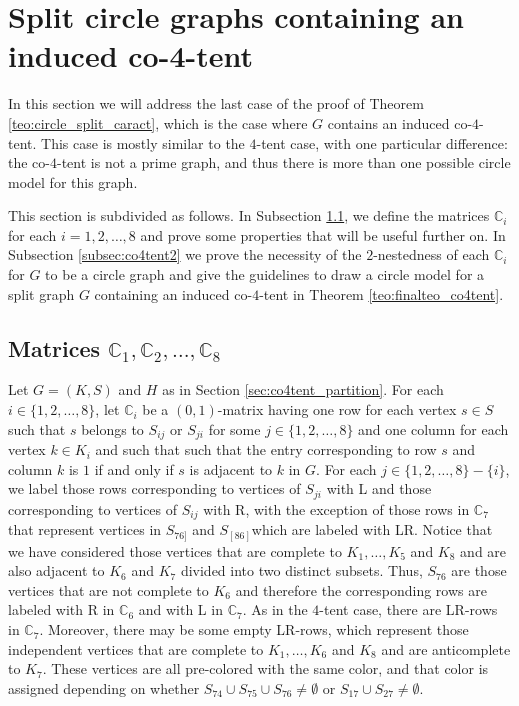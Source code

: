 \documentclass[12pt]{book}
\theoremstyle{plain}
\theoremstyle{remark}
\begin{document}
\section{Split circle graphs containing an induced co-4-tent} \label{sec:circle4}



In this section we will address the last case of the proof of Theorem \ref{teo:circle_split_caract}, which is the case where $G$ contains an induced co-$4$-tent. This case is mostly similar to the $4$-tent case, with one particular difference: the co-$4$-tent is not a prime graph, and thus there is more than one possible circle model for this graph. 

This section is subdivided as follows. In Subsection \ref{subsec:co4tent1}, we define the matrices $\mathbb{C}_i$ for each $i=1, 2, \ldots, 8$ and prove some properties that will be useful further on. 
In Subsection \ref{subsec:co4tent2} we prove the necessity of the $2$-nestedness of each $\mathbb C_i$ for $G$ to be a circle graph and give the guidelines to draw a circle model for a split graph $G$ containing an induced co-$4$-tent in Theorem \ref{teo:finalteo_co4tent}.



\subsection{Matrices $\mathbb C_1,\mathbb C_2,\ldots,\mathbb C_8$}\label{subsec:co4tent1}

Let $G=(K,S)$ and $H$ as in Section \ref{sec:co4tent_partition}. For each $i\in\{1,2,\ldots,8\}$, let $\mathbb C_i$ be a $(0,1)$-matrix having one row for each vertex $s\in S$ such that $s$ belongs to $S_{ij}$ or $S_{ji}$ for some $j\in\{1,2,\ldots,8\}$ and one column for each vertex $k\in K_i$ and such that such that the entry corresponding to row $s$ and column $k$ is $1$ if and only if $s$ is adjacent to $k$ in $G$. 
For each $j\in\{1,2,\ldots,8\}-\{i\}$, we label those rows corresponding to vertices of $S_{ji}$ with L and those corresponding to vertices of $S_{ij}$ with R, with the exception of those rows in $\mathbb{C}_7$ that represent vertices in $S_{76]}$ and $S_{[86]}$which are labeled with LR.
Notice that we have considered those vertices that are complete to $K_1, \ldots, K_5$ and $K_8$ and are also adjacent to $K_6$ and $K_7$ divided into two distinct subsets. Thus, $S_{76}$ are those vertices that are not complete to $K_6$ and therefore the corresponding rows are labeled with R in $\mathbb C_6$ and with L in $\mathbb C_7$.
As in the $4$-tent case, there are LR-rows in $\mathbb C_7$. Moreover, there may be some empty LR-rows, which represent those independent vertices that are complete to $K_1, \ldots, K_6$ and $K_8$ and are anticomplete to $K_7$. These vertices are all pre-colored with the same color, and that color is assigned depending on whether $S_{74} \cup S_{75} \cup S_{76} \neq \emptyset$ or $S_{17} \cup S_{27} \neq\emptyset$. 
\end{document}
